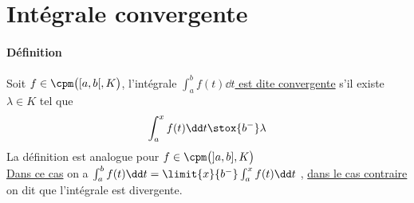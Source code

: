 

\minitoc
	\section{Intégrale convergente}
		\traitd
		\paragraph{Définition}
			Soit $f\in\cpm\big([a,b[,K\big)$, l'intégrale \underline{$\int_a^b f(t)\dd t$ est dite convergente} s'il existe $\lambda
			\in K$ tel que \[\int_a^x f(t) \dd t \stox{b^-} \lambda\] La définition est analogue pour $f\in\cpm\big(]a,b],K\big)$ \trait
		\vspace*{-1.1cm} \\ \underline{Dans ce cas} on a $\int_a^b f(t) \dd t = \limit{x}{b^-} \int_a^x f(t)\dd t$
		, \underline{dans le cas contraire} on dit que l'intégrale est divergente.
